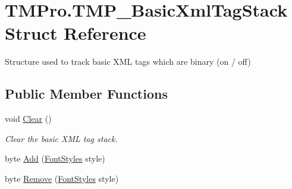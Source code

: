 \hypertarget{struct_t_m_pro_1_1_t_m_p___basic_xml_tag_stack}{}\section{T\+M\+Pro.\+T\+M\+P\+\_\+\+Basic\+Xml\+Tag\+Stack Struct Reference}
\label{struct_t_m_pro_1_1_t_m_p___basic_xml_tag_stack}


Structure used to track basic X\+ML tags which are binary (on / off)  


\subsection*{Public Member Functions}
\begin{DoxyCompactItemize}
\item 
void \mbox{\hyperlink{struct_t_m_pro_1_1_t_m_p___basic_xml_tag_stack_a67f44a1d30eec477ca2b1ef66c5a3635}{Clear}} ()
\begin{DoxyCompactList}\small\item\em Clear the basic X\+ML tag stack. \end{DoxyCompactList}\item 
byte \mbox{\hyperlink{struct_t_m_pro_1_1_t_m_p___basic_xml_tag_stack_a783f33bfcbeaa7cd8ca00fa7f90c8b37}{Add}} (\mbox{\hyperlink{namespace_t_m_pro_aedf79b6e7e2ce2b9c9ac84e790596e7c}{Font\+Styles}} style)
\item 
byte \mbox{\hyperlink{struct_t_m_pro_1_1_t_m_p___basic_xml_tag_stack_a437fa11f63cde0b26db36285d85e1b5c}{Remove}} (\mbox{\hyperlink{namespace_t_m_pro_aedf79b6e7e2ce2b9c9ac84e790596e7c}{Font\+Styles}} style)
\end{DoxyCompactItemize}
